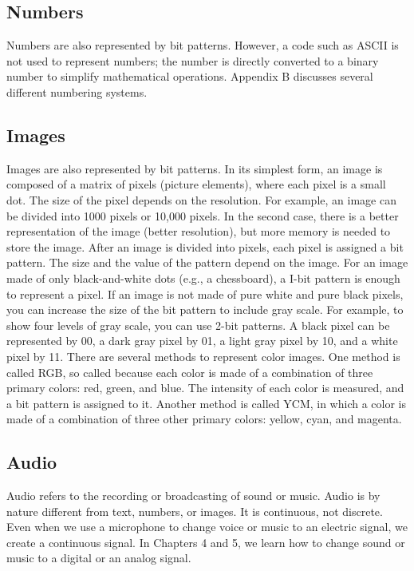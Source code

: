 \subsection*{Numbers}
Numbers are also represented by bit patterns. However, a code such as ASCII is not used to represent numbers; the number is directly converted to a binary number to simplify mathematical operations. Appendix B discusses several different numbering systems.

\subsection*{Images}
Images are also represented by bit patterns. In its simplest form, an image is composed of a matrix of pixels (picture elements), where each pixel is a small dot. The size of the pixel depends on the resolution. For example, an image can be divided into 1000 pixels or 10,000 pixels. In the second case, there is a better representation of the image (better resolution), but more memory is needed to store the image. After an image is divided into pixels, each pixel is assigned a bit pattern. The size and the value of the pattern depend on the image. For an image made of only black-and-white dots (e.g., a chessboard), a I-bit pattern is enough to represent a pixel. If an image is not made of pure white and pure black pixels, you can increase the size of the bit pattern to include gray scale. For example, to show four levels of gray scale, you can use 2-bit patterns. A black pixel can be represented by 00, a dark gray pixel by 01, a light gray pixel by 10, and a white pixel by 11. There are several methods to represent color images. One method is called RGB, so called because each color is made of a combination of three primary colors: red, green, and blue. The intensity of each color is measured, and a bit pattern is assigned to it. Another method is called YCM, in which a color is made of a combination of three other primary colors: yellow, cyan, and magenta.

\subsection*{Audio}
Audio refers to the recording or broadcasting of sound or music. Audio is by nature different from text, numbers, or images. It is continuous, not discrete. Even when we use a microphone to change voice or music to an electric signal, we create a continuous signal. In Chapters 4 and 5, we learn how to change sound or music to a digital or an analog signal.

